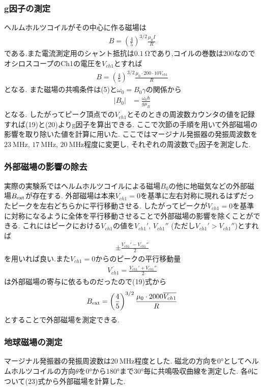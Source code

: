 \subsubsection{g因子の測定}
ヘルムホルツコイルがその中心に作る磁場は
\begin{align}
  B=\left(\frac{4}{5}\right)^{3/2}\frac{\mu_0I}{R}
\end{align}
である.また電流測定用のシャント抵抗は$0.1\ \si{\ohm}$であり,コイルの巻数は200なのでオシロスコープのCh1の電圧を$V_{ch1}$とすれば
\begin{align}
  B=\left(\frac{4}{5}\right)^{3/2}\frac{\mu_0\cdot 200\cdot10V_{ch1}}{R}
\end{align}
となる.
また磁場の共鳴条件は(5)と$\omega_0=B_0\gamma$の関係から
\begin{align}
  |B_0|&=\frac{\omega_0\hbar}{g\mu_B}
\end{align}
となる.
したがってピーク頂点での$V_{ch1}$とそのときの周波数カウンタの値を記録すれば(19)と(20)よりg因子を算出できる.
ここで次節の手順を用いて外部磁場の影響を取り除いた値を計算に用いた.
ここではマージナル発振器の発振周波数を$23\ \si{\mega\hertz}$, $17\ \si{\mega\hertz}$, $20\ \si{\mega\hertz}$程度に変更し,
それぞれの周波数でg因子を測定した.
\subsubsection{外部磁場の影響の除去}
実際の実験系ではヘルムホルツコイルによる磁場$B_0$の他に地磁気などの外部磁場$B_{\rm ext}$が存在する.
外部磁場は本来$V_{ch1}=0$を基準に左右対称に現れるはずだったピークを左右どちらかに平行移動させる.
したがってピークが$V_{ch1}=0$を基準に対称になるように全体を平行移動させることで外部磁場の影響を除くことができる.
これにはピークにおける$V_{ch1}$の値を$V_{ch1}'$, $V_{ch1}''$ (ただし$V_{ch1}'>V_{ch1}''$)とすれば
\begin{align}
  \pm\frac{V_{ch1}'-V_{ch1}''}{2}
\end{align}
を用いれば良い.また$V_{ch1}=0$からのピークの平行移動量
\begin{align}
  \overline{V_{ch1}}=\frac{V_{ch1}'+V_{ch1}''}{2}
\end{align}
は外部磁場の寄与に依るものだったので(19)式から
\begin{align}
  B_{\rm ext}=\left(\frac{4}{5}\right)^{3/2}\frac{\mu_0\cdot 2000\overline{V_{ch1}}}{R}
\end{align}
とすることで外部磁場を測定できる.
\subsubsection{地球磁場の測定}
マージナル発振器の発振周波数は$20\ \si{\mega\hertz}$程度とした.
磁北の方向を$0\si{\degree}$としてヘルムホルツコイルの方向$\theta$を$0\si{\degree}$から$180\si{\degree}$まで$30\si{\degree}$毎に共鳴吸収曲線を測定した.
各$\theta$について(23)式から外部磁場を計算した.
